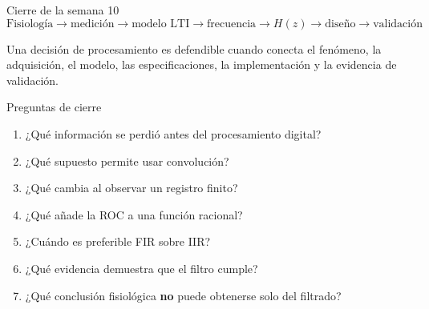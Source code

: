 \documentclass[
  ignorenonframetext,
  aspectratio=169,
  spanish,
  professionalfonts]{beamer}
\providecommand{\tightlist}{%
  \setlength{\itemsep}{0pt}\setlength{\parskip}{0pt}}
\begin{document}
\begin{frame}{Cierre de la semana 10}
\protect{}\label{cierre-de-la-semana-10}
\[
\boxed{
\text{Fisiología}
\rightarrow \text{medición}
\rightarrow \text{modelo LTI}
\rightarrow \text{frecuencia}
\rightarrow H(z)
\rightarrow \text{diseño}
\rightarrow \text{validación}
}
\]

\begin{tcolorbox}[enhanced jigsaw, arc=.35mm, bottomrule=.15mm, bottomtitle=1mm, breakable, colback=white, colbacktitle=quarto-callout-important-color!10!white, colframe=quarto-callout-important-color-frame, coltitle=black, left=2mm, leftrule=.75mm, opacityback=0, opacitybacktitle=0.6, rightrule=.15mm, title={Resultado de aprendizaje global}, titlerule=0mm, toprule=.15mm, toptitle=1mm]

Una decisión de procesamiento es defendible cuando conecta el fenómeno,
la adquisición, el modelo, las especificaciones, la implementación y la
evidencia de validación.

\end{tcolorbox}
\end{frame}

\begin{frame}{Preguntas de cierre}
\protect{}\label{preguntas-de-cierre}
\begin{enumerate}
\tightlist
\item
  ¿Qué información se perdió antes del procesamiento digital?
\item
  ¿Qué supuesto permite usar convolución?
\item
  ¿Qué cambia al observar un registro finito?
\item
  ¿Qué añade la ROC a una función racional?
\item
  ¿Cuándo es preferible FIR sobre IIR?
\item
  ¿Qué evidencia demuestra que el filtro cumple?
\item
  ¿Qué conclusión fisiológica \textbf{no} puede obtenerse solo del
  filtrado?
\end{enumerate}
\end{frame}
\end{document}
